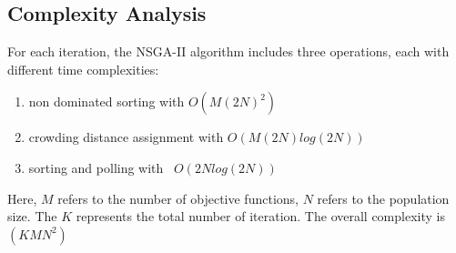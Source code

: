 \documentclass[10pt,journal,compsoc]{IEEEtran}
\begin{document}
 
\subsection{Complexity Analysis}
For each iteration, the NSGA-II algorithm includes three operations, each with different time complexities:
\begin{enumerate}
\item  non dominated sorting with $O(M(2N)^2)$
\item crowding distance assignment with
$O(M(2N)log(2N))$

\item sorting and polling with ~$O(2N log(2N))$
\end{enumerate}
Here, $M$ refers to the number of objective functions, $N$ refers to the population size.
The $K$ represents the total number of iteration. The overall complexity is $(KMN^2)$ 
\end{document}

